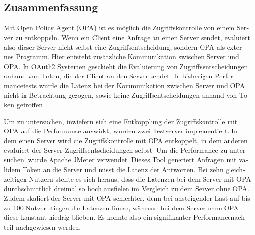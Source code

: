 \begin{otherlanguage}{ngerman}
	\chapter*{Zusammenfassung}
	Mit Open Policy Agent (OPA) ist es möglich die Zugriffskontrolle von einem Server zu entkoppeln. Wenn ein Client eine Anfrage an einen Server sendet, evaluiert also dieser Server nicht selbst eine Zugriffsentscheidung, sondern OPA als externes Programm. Hier entsteht zusätzliche Kommunikation zwischen Server und OPA. In OAuth2 Systemen geschieht die Evaluierung von Zugriffsentscheidungen anhand von Token, die der Client an den Server sendet. In bisherigen Performancetests wurde die Latenz bei der Kommunikation zwischen Server und OPA nicht in Betrachtung gezogen, sowie keine Zugriffsentscheidungen anhand von Token getroffen \citep{opaperformance:2021:06}.\smallskip

	Um zu untersuchen, inwiefern sich eine Entkopplung der Zugriffskontrolle mit OPA auf die Performance auswirkt, wurden zwei Testserver implementiert. In dem einen Server wird die Zugriffskontrolle mit OPA entkoppelt, in dem anderen evaluiert der Server Zugriffsentscheidungen selbst. Um die Performance zu untersuchen, wurde Apache JMeter verwendet. Dieses Tool generiert Anfragen mit validem Token an die Server und misst die Latenz der Antworten. Bei zehn gleichzeitigen Nutzern stellte es sich heraus, dass die Latenzen bei dem Server mit OPA durchschnittlich dreimal so hoch ausfielen im Vergleich zu dem Server ohne OPA. Zudem skaliert der Server mit OPA schlechter, denn bei ansteigender Last auf bis zu 100 Nutzer stiegen die Latenzen linear, während bei dem Server ohne OPA diese konstant niedrig blieben. Es konnte also ein signifikanter Performancenachteil nachgewiesen werden. 
	

\end{otherlanguage}
